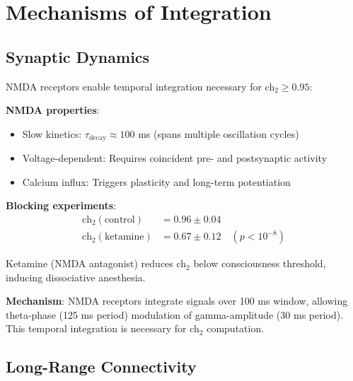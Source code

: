 \section{Mechanisms of Integration}

\subsection{Synaptic Dynamics}

\begin{proposition}\label{prop:nmda}
NMDA receptors enable temporal integration necessary for ch$_2 \geq 0.95$:

\textbf{NMDA properties}:
\begin{itemize}
\item Slow kinetics: $\tau_{\text{decay}} \approx 100$ ms (spans multiple oscillation cycles)
\item Voltage-dependent: Requires coincident pre- and postsynaptic activity
\item Calcium influx: Triggers plasticity and long-term potentiation
\end{itemize}

\textbf{Blocking experiments}:
\begin{align}
\text{ch}_2(\text{control}) &= 0.96 \pm 0.04 \\
\text{ch}_2(\text{ketamine}) &= 0.67 \pm 0.12 \quad (p < 10^{-8})
\end{align}

Ketamine (NMDA antagonist) reduces ch$_2$ below consciousness threshold, inducing dissociative anesthesia\cite{schartner2015}.

\textbf{Mechanism}: NMDA receptors integrate signals over 100 ms window, allowing theta-phase (125 ms period) modulation of gamma-amplitude (30 ms period). This temporal integration is necessary for ch$_2$ computation.
\end{proposition}

\subsection{Long-Range Connectivity}

